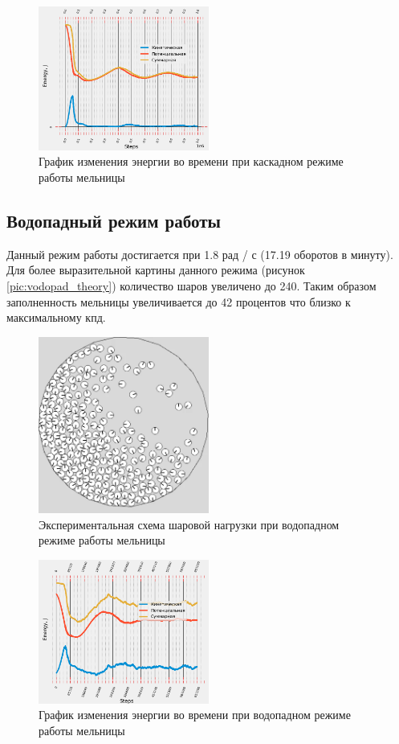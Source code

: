 \documentclass[utf8x, 14pt, oneside, a4paper]{article}
\begin{document}
\begin{figure}[H]
	\centering
	\includegraphics[width=0.5\textwidth]{kaskad_energy}
	\caption{График изменения энергии во времени при каскадном режиме работы мельницы}
	\label{pic:kaskad_energy}
\end{figure} 

\subsection{Водопадный режим работы}

Данный режим работы достигается при 1.8 рад / с (17.19 оборотов в минуту).
Для более выразительной картины данного режима (рисунок \ref{pic:vodopad_theory}) количество шаров увеличено до 240. 
Таким образом заполненность мельницы увеличивается до 42 процентов что близко к максимальному кпд. 

\begin{figure}[H]
	\centering
	\includegraphics[width=0.5\textwidth]{vodopad_result} 
	\caption{Экспериментальная схема шаровой нагрузки при водопадном режиме работы мельницы}
	\label{pic:vodopad_result}
\end{figure} 

\begin{figure}[H]
	\centering
	\includegraphics[width=0.5\textwidth]{vodopad_energy} 
	\caption{График изменения энергии во времени при водопадном режиме работы мельницы}
	\label{pic:vodopad_energy}
\end{figure} 
\end{document}
